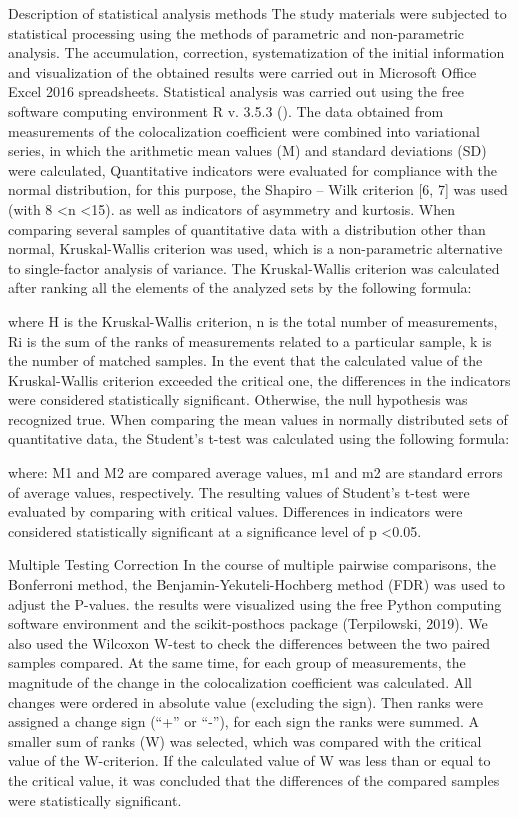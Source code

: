 \documentclass[english,authoryear]{elsarticle}
\begin{document}
Description of statistical analysis methods
The study materials were subjected to statistical processing using the methods of parametric and non-parametric analysis. The accumulation, correction, systematization of the initial information and visualization of the obtained results were carried out in Microsoft Office Excel 2016 spreadsheets.
Statistical analysis was carried out using the free software computing environment R v. 3.5.3 (\cite{team2014r}).
The data obtained from measurements of the colocalization coefficient were combined into variational series, in which the arithmetic mean values (M) and standard deviations (SD) were calculated,
Quantitative indicators were evaluated for compliance with the normal distribution, for this purpose, the Shapiro – Wilk criterion [6, 7] was used (with 8 <n <15).
as well as indicators of asymmetry and kurtosis.
When comparing several samples of quantitative data with a distribution other than normal, Kruskal-Wallis criterion was used, which is a non-parametric alternative to single-factor analysis of variance. The Kruskal-Wallis criterion was calculated after ranking all the elements of the analyzed sets by the following formula:



where H is the Kruskal-Wallis criterion, n is the total number of measurements, Ri is the sum of the ranks of measurements related to a particular sample, k is the number of matched samples.
In the event that the calculated value of the Kruskal-Wallis criterion exceeded the critical one, the differences in the indicators were considered statistically significant. Otherwise, the null hypothesis was recognized true.
When comparing the mean values in normally distributed sets of quantitative data, the Student’s t-test was calculated using the following formula:

where: M1 and M2 are compared average values, m1 and m2 are standard errors of average values, respectively. The resulting values of Student's t-test were evaluated by comparing with critical values. Differences in indicators were considered statistically significant at a significance level of p <0.05.

Multiple Testing Correction
In the course of multiple pairwise comparisons, the Bonferroni method, the Benjamin-Yekuteli-Hochberg method (FDR) was used to adjust the P-values.
the results were visualized using the free Python computing software environment and the scikit-posthocs package (Terpilowski, 2019).
We also used the Wilcoxon W-test to check the differences between the two paired samples compared. At the same time, for each group of measurements, the magnitude of the change in the colocalization coefficient was calculated. All changes were ordered in absolute value (excluding the sign). Then ranks were assigned a change sign (“+” or “-”), for each sign the ranks were summed. A smaller sum of ranks (W) was selected, which was compared with the critical value of the W-criterion. If the calculated value of W was less than or equal to the critical value, it was concluded that the differences of the compared samples were statistically significant.
\end{document}
